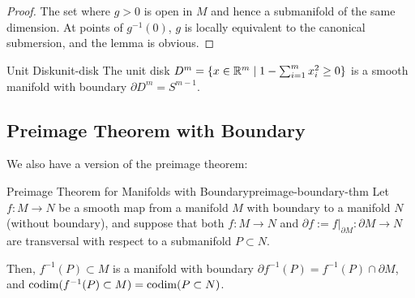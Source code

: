 \begin{proof}
    The set where $g > 0$ is open in $M$ and hence a submanifold of the same dimension. At points of $g^{-1}(0)$, $g$ is locally equivalent to the canonical submersion, and the lemma is obvious.
\end{proof}

\begin{example}{Unit Disk}{unit-disk}
    The unit disk $D^m = \{x \in \mathbb{R}^m \mid 1 - \sum_{i=1}^m x_i^2 \geq 0\}$ is a smooth manifold with boundary $\partial D^m = S^{m-1}$.
\end{example}

\subsection{Preimage Theorem with Boundary}

We also have a version of the preimage theorem:

\begin{theorem}{Preimage Theorem for Manifolds with Boundary}{preimage-boundary-thm}
    Let $f \colon M \to N$ be a smooth map from a manifold $M$ with boundary to a manifold $N$ (without boundary), and suppose that both $f \colon M \to N$ and $\partial f := f|_{\partial M} \colon \partial M \to N$ are transversal with respect to a submanifold $P \subset N$.

    Then, $f^{-1}(P) \subset M$ is a manifold with boundary $\partial f^{-1}(P) = f^{-1}(P) \cap \partial M$, and $\operatorname{codim}(f^{-1}(P) \subset M) = \operatorname{codim}(P \subset N)$.
\end{theorem}

